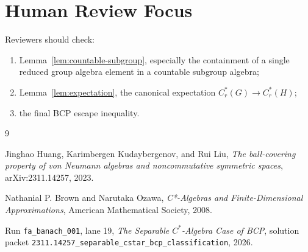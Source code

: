 \documentclass[11pt]{article}
\newcommand{\Cr}{C^*_r}
\begin{document}
\section*{Human Review Focus}

Reviewers should check:
\begin{enumerate}
    \item Lemma~\ref{lem:countable-subgroup}, especially the containment of a
          single reduced group algebra element in a countable subgroup
          algebra;
    \item Lemma~\ref{lem:expectation}, the canonical expectation
          \(\Cr(G)\to\Cr(H)\);
    \item the final BCP escape inequality.
\end{enumerate}

\begin{thebibliography}{9}

Jinghao Huang, Karimbergen Kudaybergenov, and Rui Liu,
\emph{The ball-covering property of von Neumann algebras and noncommutative
symmetric spaces},
arXiv:2311.14257, 2023.

Nathanial P. Brown and Narutaka Ozawa,
\emph{C*-Algebras and Finite-Dimensional Approximations},
American Mathematical Society, 2008.

Run \texttt{fa\_banach\_001}, lane 19,
\emph{The Separable \(C^*\)-Algebra Case of BCP},
solution packet
\texttt{2311.14257\_separable\_cstar\_bcp\_classification}, 2026.

\end{thebibliography}
\end{document}

